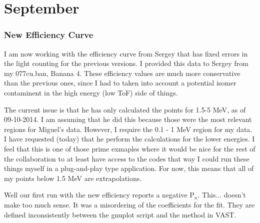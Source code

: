 \chapter{September}
\subsection{New Efficiency Curve}
I am now working with the efficiency curve from Sergey that has fixed errors in 
the light counting for the previous versions. I provided this data to Sergey 
from my 077cu.ban, Banana 4. These efficiency values are much more conservative
than the previous ones, since I had to taken into account a potential isomer
contaminent in the high energy (low ToF) side of things. 

The current issue is that he has only calculated the points for 1.5-5 MeV, as 
of 09-10-2014. I am assuming that he did this because those were the most 
relevant regions for Miguel's data. However, I require the 0.1 - 1 MeV region 
for my data. I have requested (today) that he perform the calculations for the 
lower energies. I feel that this is one of those prime exmaples where it would 
be nice for the rest of the collaboration to at least have access to the codes
that way I could run these things myself in a plug-and-play type application. 
For now, this means that all of my points below 1.5 MeV are extrapolations.

Well our first run with the new efficiency reports a negative P$_n$. This...
doesn't make too much sense. It was a misordering of the coefficients for 
the fit. They are defined inconsistently between the gnuplot script and the 
method in VAST.
